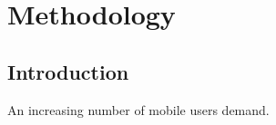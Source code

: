 \chapter{Methodology}\label{Ch:3}
	
\section{Introduction }\label{sec:Introduction3}
 An increasing number of mobile users demand.


